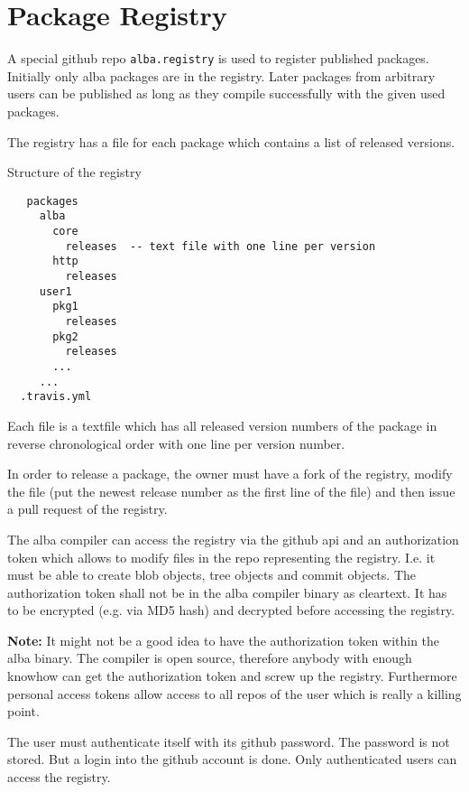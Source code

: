 \section{Package Registry}

A special github repo \verb|alba.registry| is used to register published
packages. Initially only alba packages are in the registry. Later packages
from arbitrary users can be published as long as they compile successfully
with the given used packages.

The registry has a file for each package which contains a list of released
versions.

\noindent Structure of the registry
{\small
\begin{verbatim}
   packages
     alba
       core
         releases  -- text file with one line per version
       http
         releases
     user1
       pkg1
         releases
       pkg2
         releases
       ...
     ...
  .travis.yml
\end{verbatim}
}
Each file  is a textfile which has all released version numbers
of the package in reverse chronological order with one line per version
number.

In order to release a package, the owner must have a fork of the registry,
modify the file  (put the newest release
number as the first line of the file) and then issue a pull request of the
registry.








The alba compiler can access the registry via the github api and an
authorization token which allows to modify files in the repo representing the
registry. I.e. it must be able to create blob objects, tree objects and commit
objects. The authorization token shall not be in the alba compiler binary
as cleartext. It has to be encrypted (e.g. via MD5 hash) and decrypted before
accessing the registry.

{\bf Note:} It might not be a good idea to have the authorization token within
the alba binary. The compiler is open source, therefore anybody with enough
knowhow can get the authorization token and screw up the registry. Furthermore
personal access tokens allow access to all repos of the user which is really a
killing point.

The user must authenticate itself with its github password. The password is
not stored. But a login into the github account is done. Only authenticated
users can access the registry.


